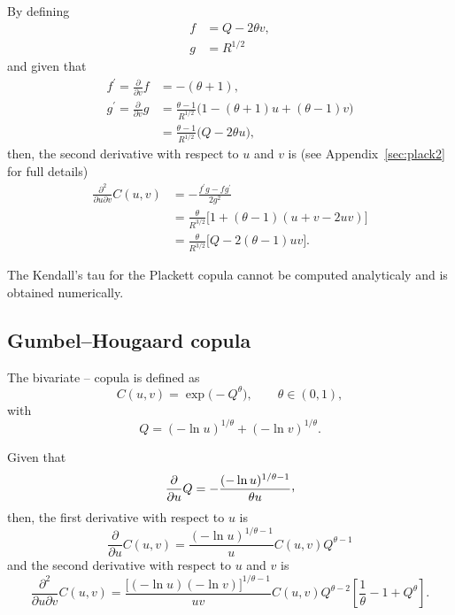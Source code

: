 \documentclass{article}
\def\ccom{\raisebox{.45ex}{\textrm{,}}}
\begin{document}
By defining
\begin{align}
    f &= Q - 2 \theta v,\\
    g &= R^{1/2}
\end{align}
and given that
\begin{align}
    f^\prime = \frac{\partial}{\partial v} f &= -(\theta + 1),\\
    g^\prime = \frac{\partial}{\partial v} g &= \frac{\theta-1}{R^{1/2}} \Big(
        1 - (\theta+1) u + (\theta-1) v \Big)
                \nonumber\\
         &= \frac{\theta-1}{R^{1/2}} \Big(Q - 2 \theta u \Big),
\end{align}
then, the second derivative with respect to $u$ and $v$ is 
  (see Appendix~\ref{sec:plack2} for full details)
\begin{align}
    \frac{\partial^2}{\partial u\partial v}C(u,v)
        &= - \frac{f^\prime g - fg^\prime}{2 g^2}
        \nonumber\\
        &= \frac\theta{R^{3/2}}\Big[
            1 + (\theta-1)(u+v-2uv)\Big]
        \nonumber\\
        &= \frac\theta{R^{3/2}}\Big[
            Q - 2(\theta-1)uv\Big].
\end{align}


The Kendall's tau for the Plackett copula cannot be computed analyticaly
  and is obtained numerically.




\subsection*{Gumbel--Hougaard copula}
The bivariate \cite{Gumbel60}--\cite{Hougaard86} copula is defined as
\begin{equation}
    C(u,v)= \exp\Big(-Q^\theta \Big), \qquad \theta \in (0, 1),
\end{equation}
with 
\begin{equation}
    Q= (- \ln u)^{1/\theta} + (- \ln v)^{1/\theta}.
\end{equation}

Given that
\begin{equation}
    \frac{\partial}{\partial u}Q
        = -\frac{(- \ln u)^{1/\theta-1}}{\theta u}\ccom
\end{equation}
then, the first derivative with respect to $u$ is 
\begin{equation}
    \frac{\partial}{\partial u}C(u,v)
    = \frac{ (-\ln u)^{1/\theta - 1} }u C(u, v) Q^{\theta-1}
    \label{eq:GHder}
\end{equation}
and the second derivative with respect to $u$ and $v$ is 
\begin{equation}
    \frac{\partial^2}{\partial u\partial v}C(u,v)
        = \frac{ \Big[ (-\ln u)(-\ln v) \Big]^{1/\theta - 1} }{uv}
            C(u, v) Q^{\theta-2}
            \left[\frac1\theta -1 + Q^\theta\right].
\end{equation}
\end{document}

